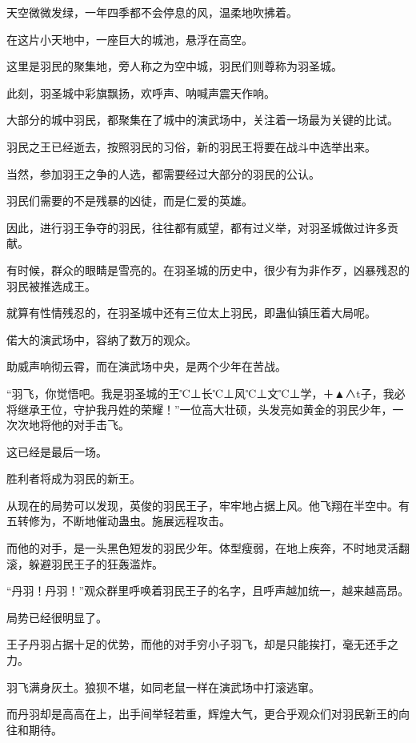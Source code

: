 
\begin{this_body}

天空微微发绿，一年四季都不会停息的风，温柔地吹拂着。

在这片小天地中，一座巨大的城池，悬浮在高空。

这里是羽民的聚集地，旁人称之为空中城，羽民们则尊称为羽圣城。

此刻，羽圣城中彩旗飘扬，欢呼声、呐喊声震天作响。

大部分的城中羽民，都聚集在了城中的演武场中，关注着一场最为关键的比试。

羽民之王已经逝去，按照羽民的习俗，新的羽民王将要在战斗中选举出来。

当然，参加羽王之争的人选，都需要经过大部分的羽民的公认。

羽民们需要的不是残暴的凶徒，而是仁爱的英雄。

因此，进行羽王争夺的羽民，往往都有威望，都有过义举，对羽圣城做过许多贡献。

有时候，群众的眼睛是雪亮的。在羽圣城的历史中，很少有为非作歹，凶暴残忍的羽民被推选成王。

就算有性情残忍的，在羽圣城中还有三位太上羽民，即蛊仙镇压着大局呢。

偌大的演武场中，容纳了数万的观众。

助威声响彻云霄，而在演武场中央，是两个少年在苦战。

“羽飞，你觉悟吧。我是羽圣城的王℃⊥长℃⊥风℃⊥文℃⊥学，＋▲∧t子，我必将继承王位，守护我丹姓的荣耀！”一位高大壮硕，头发亮如黄金的羽民少年，一次次地将他的对手击飞。

这已经是最后一场。

胜利者将成为羽民的新王。

从现在的局势可以发现，英俊的羽民王子，牢牢地占据上风。他飞翔在半空中。有五转修为，不断地催动蛊虫。施展远程攻击。

而他的对手，是一头黑色短发的羽民少年。体型瘦弱，在地上疾奔，不时地灵活翻滚，躲避羽民王子的狂轰滥炸。

“丹羽！丹羽！”观众群里呼唤着羽民王子的名字，且呼声越加统一，越来越高昂。

局势已经很明显了。

王子丹羽占据十足的优势，而他的对手穷小子羽飞，却是只能挨打，毫无还手之力。

羽飞满身灰土。狼狈不堪，如同老鼠一样在演武场中打滚逃窜。

而丹羽却是高高在上，出手间举轻若重，辉煌大气，更合乎观众们对羽民新王的向往和期待。


\end{this_body}

